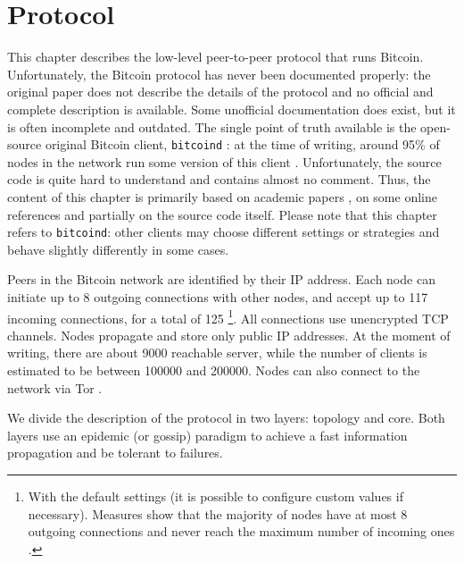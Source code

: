\chapter{Protocol}
\label{chapter:protocol}
This chapter describes the low-level peer-to-peer protocol that runs Bitcoin.
Unfortunately, the Bitcoin protocol has never been documented properly:
the original paper \cite{bitcoin_2009} does not describe the details of the protocol and no official and complete description is available.
Some unofficial documentation does exist, but it is often incomplete and outdated.
The single point of truth available is the open-source original Bitcoin client, \texttt{bitcoind} \cite{bitcoin_github}:
at the time of writing, around \num{95}\% of nodes in the network run some version of this client \cite{bitnodes}.
Unfortunately, the source code is quite hard to understand and contains almost no comment.
Thus, the content of this chapter is primarily based on academic papers \cite{eclipse_attack_2015, deanonymization_2014}, on some online references \cite{bitcoin_reference, bitcoin_guide} and partially on the source code itself.
Please note that this chapter refers to \texttt{bitcoind}:
other clients may choose different settings or strategies and behave slightly differently in some cases.

\bigskip
Peers in the Bitcoin network are identified by their IP address.
Each node can initiate up to \num{8} outgoing connections with other nodes, and accept up to \num{117} incoming connections, for a total of \num{125} \footnote{With the default settings (it is possible to configure custom values if necessary). Measures show that the majority of nodes have at most \num{8} outgoing connections and never reach the maximum number of incoming ones \cite{discovering_influential_nodes_2014}.}.
All connections use unencrypted TCP channels.
Nodes propagate and store only public IP addresses.
At the moment of writing, there are about \num{9000} reachable server, while the number of clients is estimated to be between \num{100000} and \num{200000}.
Nodes can also connect to the network via Tor \cite{bicoin_tor}.

\bigskip
We divide the description of the protocol in two layers: topology and core.
Both layers use an epidemic (or gossip) paradigm \cite{gossip_1987} to achieve a fast information propagation and be tolerant to failures.


